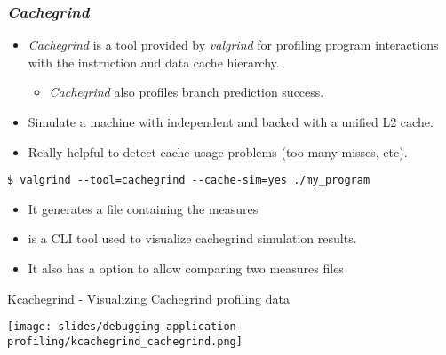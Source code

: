 \begin{frame}[fragile]
  \frametitle{{\em Cachegrind}}
  \begin{itemize}
    \item {\em Cachegrind} is a tool provided by {\em valgrind} for
      profiling program interactions with the instruction and data cache hierarchy.
    \begin{itemize}
      \item {\em Cachegrind} also profiles branch prediction success.
    \end{itemize}
    \item Simulate a machine with independent  and  backed
          with a unified L2 cache.
    \item Really helpful to detect cache usage problems (too many misses, etc).
  \end{itemize}
  \begin{block}{}
    \begin{verbatim}
$ valgrind --tool=cachegrind --cache-sim=yes ./my_program
    \end{verbatim}
  \end{block}
  \begin{itemize}
    \item It generates a  file containing the measures
    \item {} is a CLI tool used to visualize cachegrind
          simulation results.
    \item It also has a  option to allow comparing two measures files
  \end{itemize}
\end{frame}

\begin{frame}{Kcachegrind - Visualizing Cachegrind profiling data}
  \begin{center}
    \texttt{[image: slides/debugging-application-profiling/kcachegrind\_cachegrind.png]}
  \end{center}
\end{frame}

